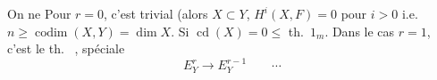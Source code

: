 \documentclass[11pt,a4paper]{article}
\begin{document}
On ne \ill{} \ill{} Pour $r = 0$, c'est trivial (alors $X \subset Y$, \ill{}
$H^{i}(X,F) = 0$ pour $i > 0$ i.e.\ \ill{}
$n \geqslant \operatorname{codim}(X,Y) = \dim X$. Si
$\operatorname{cd}(X) = 0 \leqslant$ \struck{\ill{}} \ill{} th.\ $1_{m}$.
Dans le cas $r = 1$, c'est le th.\ \ill{}  , \ill{} \ill{} spéciale \ill{}
\[
E^{r}_{Y} \longrightarrow E^{r-1}_{Y} \qquad \cdots
\]
\end{document}
